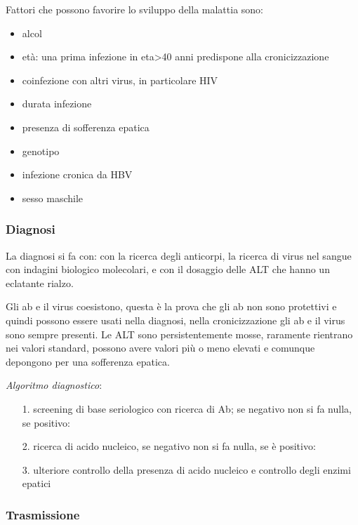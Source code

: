   Fattori che possono favorire lo sviluppo della malattia sono:

\begin{itemize}
\item
  alcol
\item
  età: una prima infezione in eta>40 anni predispone alla
  cronicizzazione
\item
  coinfezione con altri virus, in particolare HIV
\item
  durata infezione
\item
  presenza di sofferenza epatica
\item
  genotipo
\item
  infezione cronica da HBV
\item
  sesso maschile
\end{itemize}

\subsubsection{Diagnosi}

  La diagnosi si fa con: con la ricerca degli anticorpi, la ricerca di
  virus nel sangue con indagini biologico molecolari, e con il dosaggio
  delle ALT che hanno un eclatante rialzo.

  Gli ab e il virus coesistono, questa è la prova che gli ab non sono
  protettivi e quindi possono essere usati nella diagnosi, nella
  cronicizzazione gli ab e il virus sono sempre presenti. Le ALT sono
  persistentemente mosse, raramente rientrano nei valori standard,
  possono avere valori più o meno elevati e comunque depongono per una
  sofferenza epatica.

  \emph{Algoritmo diagnostico}:

\begin{itemize}
\item[1.]
  screening di base seriologico con ricerca di Ab; se negativo non si fa
  nulla, se positivo:
\item[2.]
  ricerca di acido nucleico, se negativo non si fa nulla, se è positivo:
\item[3.]
  ulteriore controllo della presenza di acido nucleico e controllo degli
  enzimi epatici
\end{itemize}
\subsubsection{Trasmissione}
      
